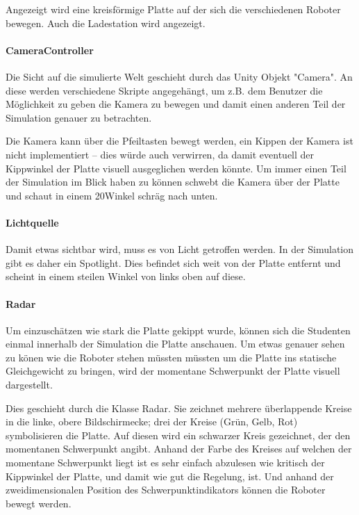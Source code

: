 Angezeigt wird eine kreisf{\"{o}}rmige Platte auf der sich die verschiedenen Roboter bewegen. Auch die
Ladestation wird angezeigt.

\paragraph{CameraController} Die Sicht auf die simulierte Welt geschieht durch das Unity Objekt "Camera". An diese
werden verschiedene Skripte angegeh{\"{a}}ngt, um z.B. dem Benutzer die M{\"{o}}glichkeit zu
geben die Kamera zu bewegen und damit einen anderen Teil der Simulation genauer zu betrachten.

Die Kamera kann {\"{u}}ber die Pfeiltasten bewegt werden, ein Kippen der Kamera ist nicht implementiert --
dies w{\"{u}}rde auch verwirren, da damit eventuell der Kippwinkel der Platte visuell ausgeglichen
werden k{\"{o}}nnte. Um immer einen Teil der Simulation im Blick haben zu k{\"{o}}nnen schwebt die Kamera
{\"{u}}ber der Platte und schaut in einem 20\textdegree Winkel schr{\"{a}}g nach unten.

\paragraph{Lichtquelle} Damit etwas sichtbar wird, muss es von Licht getroffen werden. In der Simulation
gibt es daher ein Spotlight. Dies befindet sich weit von der Platte entfernt und scheint in einem steilen Winkel
von links oben auf diese.

\paragraph{Radar} Um einzusch{\"{a}}tzen wie stark die Platte gekippt wurde, k{\"{o}}nnen sich die Studenten einmal
innerhalb der Simulation die Platte anschauen. Um etwas genauer sehen zu k{\"{o}}nen wie die Roboter stehen m{\"{u}}ssten
m{\"{u}}ssten um die Platte ins statische Gleichgewicht zu bringen, wird der momentane Schwerpunkt der Platte visuell
dargestellt.

Dies geschieht durch die Klasse Radar. Sie zeichnet mehrere {\"{u}}berlappende Kreise in die linke, obere Bildschirmecke;
drei der Kreise (Gr{\"{u}}n, Gelb, Rot) symbolisieren die Platte. Auf diesen wird ein schwarzer Kreis gezeichnet, der den
momentanen Schwerpunkt angibt. Anhand der Farbe des Kreises auf welchen der momentane Schwerpunkt liegt ist es sehr einfach
abzulesen wie kritisch der Kippwinkel der Platte, und damit wie gut die Regelung, ist. Und anhand der zweidimensionalen Position
des Schwerpunktindikators k{\"{o}}nnen die Roboter bewegt werden.

